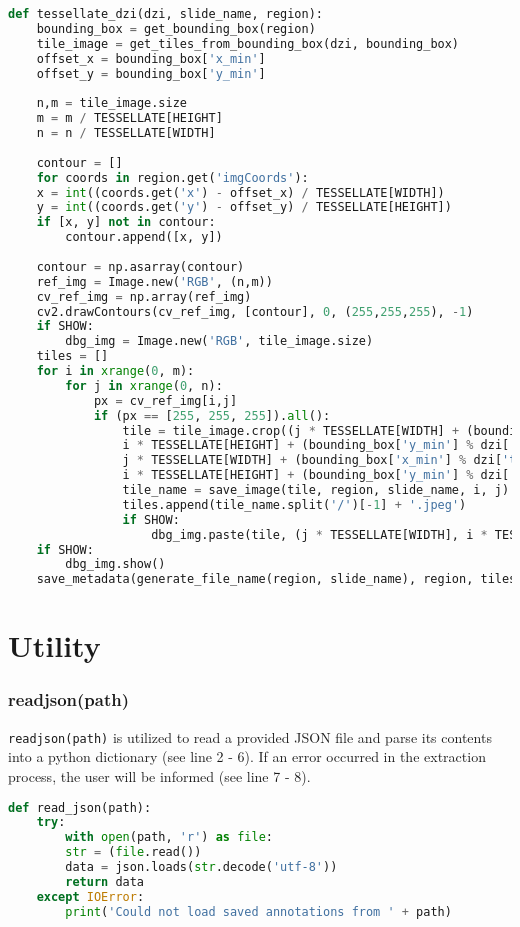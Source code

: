 \begin{lstlisting}[frame=single,language=python]
def tessellate_dzi(dzi, slide_name, region):
	bounding_box = get_bounding_box(region)
	tile_image = get_tiles_from_bounding_box(dzi, bounding_box)
	offset_x = bounding_box['x_min']
	offset_y = bounding_box['y_min']
	
	n,m = tile_image.size
	m = m / TESSELLATE[HEIGHT]
	n = n / TESSELLATE[WIDTH]
	
	contour = []
	for coords in region.get('imgCoords'):
	x = int((coords.get('x') - offset_x) / TESSELLATE[WIDTH])
	y = int((coords.get('y') - offset_y) / TESSELLATE[HEIGHT])
	if [x, y] not in contour:
		contour.append([x, y])
	
	contour = np.asarray(contour)
	ref_img = Image.new('RGB', (n,m))
	cv_ref_img = np.array(ref_img)
	cv2.drawContours(cv_ref_img, [contour], 0, (255,255,255), -1)
	if SHOW:
		dbg_img = Image.new('RGB', tile_image.size)
	tiles = []
	for i in xrange(0, m):
		for j in xrange(0, n):
			px = cv_ref_img[i,j]
			if (px == [255, 255, 255]).all():
				tile = tile_image.crop((j * TESSELLATE[WIDTH] + (bounding_box['x_min'] % dzi['tile_size']),
				i * TESSELLATE[HEIGHT] + (bounding_box['y_min'] % dzi['tile_size']),
				j * TESSELLATE[WIDTH] + (bounding_box['x_min'] % dzi['tile_size']) + TESSELLATE[WIDTH],
				i * TESSELLATE[HEIGHT] + (bounding_box['y_min'] % dzi['tile_size']) + TESSELLATE[HEIGHT]))
				tile_name = save_image(tile, region, slide_name, i, j)
				tiles.append(tile_name.split('/')[-1] + '.jpeg')
				if SHOW:
					dbg_img.paste(tile, (j * TESSELLATE[WIDTH], i * TESSELLATE[HEIGHT]))
	if SHOW:
		dbg_img.show()
	save_metadata(generate_file_name(region, slide_name), region, tiles)
\end{lstlisting}


\section{Utility}

\subsubsection{read{\textunderscore}json(path)}
\texttt{read{\textunderscore}json(path)} is utilized to read a provided JSON file and parse its contents into a python dictionary (see line 2 - 6). If an error occurred in the extraction process, the user will be informed (see line 7 - 8).

\begin{lstlisting}[frame=single,language=python]
def read_json(path):
	try:
		with open(path, 'r') as file:
		str = (file.read())
		data = json.loads(str.decode('utf-8'))
		return data
	except IOError:
		print('Could not load saved annotations from ' + path)
\end{lstlisting}


